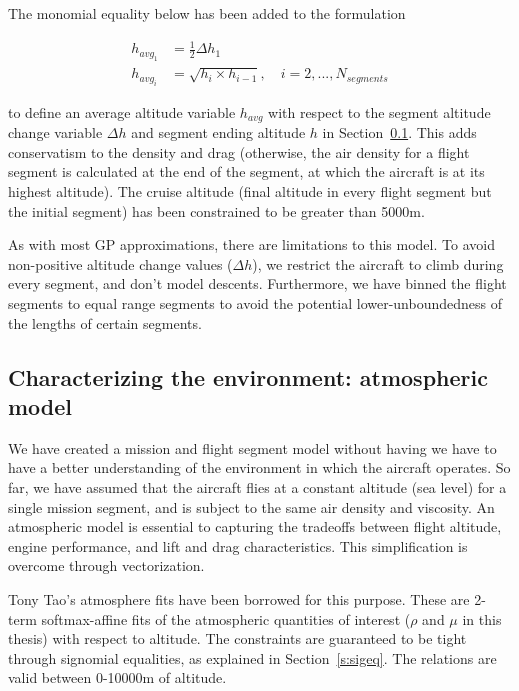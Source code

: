 The monomial equality below has been added to the formulation

\begin{align}
    h_{{avg}_1} &= \frac{1}{2}\Delta h_1 \\
    h_{{avg}_i} &= \sqrt{h_{i} \times h_{i-1}}, \quad i = 2,...,N_{segments}
\end{align}

to define an average altitude variable $h_{avg}$ with respect to the segment altitude change variable $\Delta h$
and segment ending altitude $h$
in Section~\ref{s:atmos}. This adds
conservatism to the density and drag (otherwise, the air density for a flight segment is calculated
at the end of the segment, at which the aircraft is at its highest altitude).
The cruise altitude (final altitude in every flight segment but the initial segment) has been constrained
to be greater than 5000m.

As with most \gls{GP} approximations, there are limitations to this model. To avoid non-positive
altitude change values ($\Delta h$), we restrict the aircraft to climb during every segment, and
don't model descents. Furthermore, we have binned the flight segments to equal range segments to
avoid the potential lower-unboundedness of the lengths of certain segments.

\subsection{Characterizing the environment: atmospheric model}
\label{s:atmos}

We have created a mission and flight segment model without having we have to have a better understanding
of the environment in which the aircraft operates. So far, we have assumed that
the aircraft flies at a constant altitude (sea level) for a single mission segment,
and is subject to the same air density and viscosity.
An atmospheric model is essential to capturing the tradeoffs between flight altitude, engine performance,
and lift and drag characteristics.
This simplification is overcome through vectorization.

Tony Tao's atmosphere fits have been borrowed for this purpose. These are
2-term softmax-affine fits of the atmospheric
quantities of interest ($\rho$ and $\mu$ in this thesis) with respect to altitude. The constraints
are guaranteed to be tight through signomial equalities, as explained in Section~\ref{s:sigeq}.
The relations are valid between 0-10000m of altitude.

